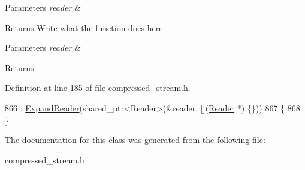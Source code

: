 \begin{DoxyParams}{Parameters}
{\em reader} & \\
\hline
\end{DoxyParams}
\begin{DoxyReturn}{Returns}
Write what the function does here
\end{DoxyReturn}

\begin{DoxyParams}{Parameters}
{\em reader} & \\
\hline
\end{DoxyParams}
\begin{DoxyReturn}{Returns}

\end{DoxyReturn}


Definition at line 185 of file compressed\+\_\+stream.\+h.


\begin{DoxyCode}
866             : \hyperlink{classExpandReader_a6e08c2a0ddfcaf4039364a7d5b86c713}{ExpandReader}(shared\_ptr<Reader>(&reader, [](\hyperlink{classReader}{Reader} *) \{\}))
867             \{
868             \}
\end{DoxyCode}


The documentation for this class was generated from the following file\+:\begin{DoxyCompactItemize}
\item 
compressed\+\_\+stream.\+h\end{DoxyCompactItemize}
